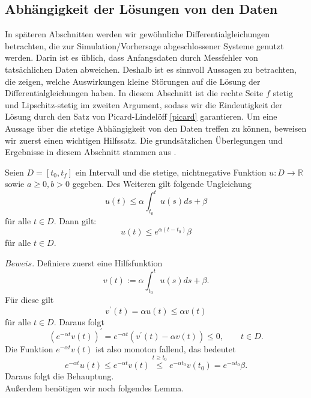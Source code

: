 \subsection{Abhängigkeit der Lösungen von den Daten}
In späteren Abschnitten werden wir gewöhnliche Differentialgleichungen betrachten, die zur Simulation/Vorhersage
abgeschlossener Systeme genutzt werden. Darin ist es üblich, dass Anfangsdaten durch Messfehler
von tatsächlichen Daten abweichen. Deshalb ist es sinnvoll Aussagen zu betrachten, die zeigen, welche Auswirkungen
kleine Störungen auf die Lösung der Differentialgleichungen haben. In diesem Abschnitt ist die rechte Seite $f$ stetig
und Lipschitz-stetig im zweiten Argument, sodass wir die Eindeutigkeit der Lösung durch den Satz von Picard-Lindelöff
\eqref{picard} garantieren. Um eine Aussage über die stetige Abhängigkeit von den Daten treffen zu können, beweisen
wir zuerst einen wichtigen Hilfssatz. Die grundsätzlichen Überlegungen und Ergebnisse in diesem Abschnitt stammen aus
\cite{beckGewohnlicheDifferentialgleichungen2018}.
\begin{theorem}
    \label{Satz-gronwall}
    Seien $D=[t_{0}, t_{f}]$ ein Intervall und die stetige, nichtnegative Funktion $u : D \rightarrow \mathbb{R}$
    sowie $a \geq 0, b > 0$ gegeben. Des Weiteren gilt folgende Ungleichung
    \[
        u(t) \leq \alpha \int_{t_{0}}^{t}u(s)ds + \beta
    \]
    für alle $t \in D$. Dann gilt:
    \[
        u(t) \leq e^{\alpha(t-t_{0})}\beta
    \]
    für alle $t \in D$.
\end{theorem}
$Beweis.$ Definiere zuerst eine Hilfsfunktion
\[
    v(t) := \alpha \int_{t_{0}}^{t} u(s)ds + \beta.
\] Für diese gilt
\[
    v^\prime(t) = \alpha u(t) \leq \alpha v(t)
\] für alle $t \in D$. Daraus folgt
\[
    (e^{-\alpha t}v(t))^\prime = e^{-\alpha t}(v^\prime(t)-\alpha v(t)) \leq 0, \qquad t \in D.
\]
Die Funktion $e^{-\alpha t} v(t)$ ist also monoton fallend, das bedeutet
\[
    e^{-\alpha t} u(t) \leq e^{-\alpha t} v(t) \stackrel{t \geq t_{0}}{\leq} e^{-\alpha t_{0}} v(t_{0}) = e^{-\alpha t_{0}}\beta.
\] Daraus folgt die Behauptung. \qedwhite \\
Außerdem benötigen wir noch folgendes Lemma.
